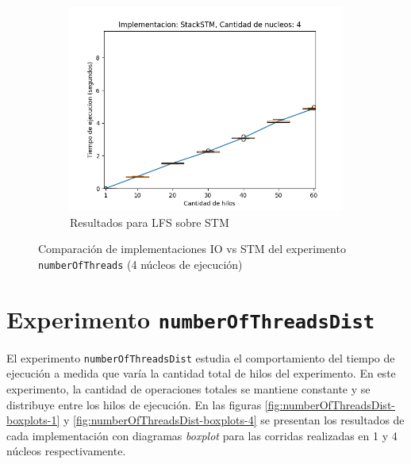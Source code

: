 \begin{appendices}
\begin{figure}[t]
\begin{subfigure}[b]{0.49\textwidth}
        \includegraphics[width=\textwidth]{images/numberOfThreads/plots/expStackSTM-4}
        \caption{Resultados para LFS sobre STM}
        \label{subfig:numberOfThreads-stackstm-4}
    \end{subfigure}
    \caption{Comparación de implementaciones IO vs STM del experimento \texttt{numberOfThreads} (4 núcleos de ejecución)}
    \label{fig:numberOfThreads-boxplots-4}
\end{figure}


\section{Experimento \texttt{numberOfThreadsDist}}
El experimento \texttt{numberOfThreadsDist} estudia el comportamiento del tiempo de ejecución a medida que varía la cantidad total de hilos del experimento. En este experimento, la cantidad de operaciones totales se mantiene constante y se distribuye entre los hilos de ejecución. En las figuras \ref{fig:numberOfThreadsDist-boxplots-1} y \ref{fig:numberOfThreadsDist-boxplots-4} se presentan los resultados de cada implementación con diagramas \emph{boxplot} para las corridas realizadas en 1 y 4 núcleos respectivamente.



\end{appendices}
